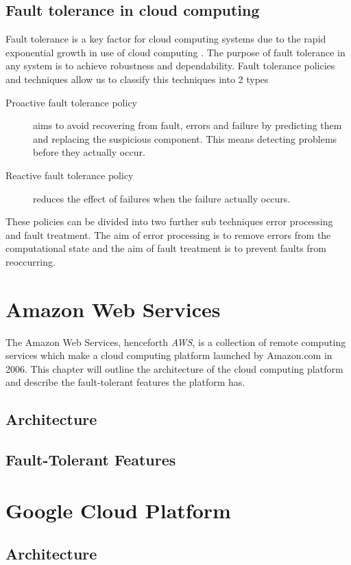 \documentclass[11pt]{report}
\begin{document}
\section{Fault tolerance in cloud computing}
Fault tolerance is a key factor for cloud computing systems due to the rapid exponential growth in use of cloud computing \cite{faulttolerancetechniques}. The purpose of fault tolerance in any system is to achieve robustness and dependability. Fault tolerance policies and techniques allow us to classify this techniques into 2 types
\begin{description}
\item[Proactive fault tolerance policy] aims to avoid recovering from fault, errors and failure by predicting them and replacing the suspicious component. This means detecting problems before they actually occur.
\item[Reactive fault tolerance policy] reduces the effect of failures when the failure actually occurs.
\end{description}
These policies can be divided into two further sub techniques error processing and fault treatment. The aim of error processing is to remove errors from the computational state and the aim of fault treatment is to prevent faults from reoccurring.

\chapter{Amazon Web Services}
The Amazon Web Services, henceforth \emph{AWS}, is a collection of remote computing services which make a cloud computing platform launched by Amazon.com in 2006. This chapter will outline the architecture of the cloud computing platform and describe the fault-tolerant features the platform has.

\section{Architecture}
\section{Fault-Tolerant Features}

\chapter{Google Cloud Platform}
\section{Architecture}
\end{document}
